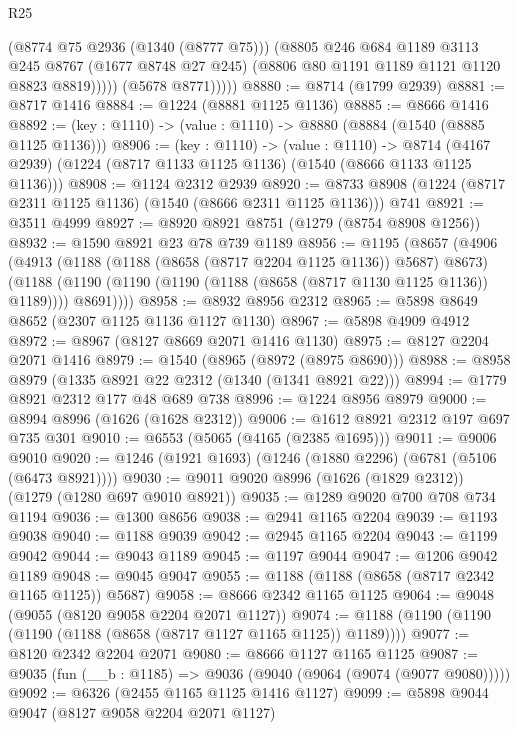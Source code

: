 \begin{lexlean}{R25}
\begin{coremodule}
                  (@8774 @75 @2936 (@1340 (@8777 @75)))
                  (@8805
                    @246
                    @684
                    @1189
                    @3113
                    @245
                    @8767
                    (@1677 @8748 @27 @245)
                    (@8806 @80 @1191 @1189 @1121 @1120 @8823 @8819)))))
            (@5678 @8771)))))
@8880 := @8714 (@1799 @2939)
@8881 := @8717 @1416
@8884 := @1224 (@8881 @1125 @1136)
@8885 := @8666 @1416
@8892 := (key : @1110) -> (value : @1110) -> @8880 (@8884 (@1540 (@8885 @1125 @1136)))
@8906 := (key : @1110) ->
  (value : @1110) ->
  @8714 (@4167 @2939) (@1224 (@8717 @1133 @1125 @1136) (@1540 (@8666 @1133 @1125 @1136)))
@8908 := @1124 @2312 @2939
@8920 := @8733 @8908 (@1224 (@8717 @2311 @1125 @1136) (@1540 (@8666 @2311 @1125 @1136))) @741
@8921 := @3511 @4999
@8927 := @8920 @8921 @8751 (@1279 (@8754 @8908 @1256))
@8932 := @1590 @8921 @23 @78 @739 @1189
@8956 := @1195
    (@8657
      (@4906
        (@4913
          (@1188 (@1188 (@8658 (@8717 @2204 @1125 @1136)) @5687) @8673)
          (@1188 (@1190 (@1190 (@1190 (@1188 (@8658 (@8717 @1130 @1125 @1136)) @1189)))) @8691))))
@8958 := @8932 @8956 @2312
@8965 := @5898 @8649 @8652 (@2307 @1125 @1136 @1127 @1130)
@8967 := @5898 @4909 @4912
@8972 := @8967 (@8127 @8669 @2071 @1416 @1130)
@8975 := @8127 @2204 @2071 @1416
@8979 := @1540 (@8965 (@8972 (@8975 @8690)))
@8988 := @8958 @8979 (@1335 @8921 @22 @2312 (@1340 (@1341 @8921 @22)))
@8994 := @1779 @8921 @2312 @177 @48 @689 @738
@8996 := @1224 @8956 @8979
@9000 := @8994 @8996 (@1626 (@1628 @2312))
@9006 := @1612 @8921 @2312 @197 @697 @735 @301
@9010 := @6553 (@5065 (@4165 (@2385 @1695)))
@9011 := @9006 @9010
@9020 := @1246 (@1921 @1693) (@1246 (@1880 @2296) (@6781 (@5106 (@6473 @8921))))
@9030 := @9011 @9020 @8996 (@1626 (@1829 @2312)) (@1279 (@1280 @697 @9010 @8921))
@9035 := @1289 @9020 @700 @708 @734 @1194
@9036 := @1300 @8656
@9038 := @2941 @1165 @2204
@9039 := @1193 @9038
@9040 := @1188 @9039
@9042 := @2945 @1165 @2204
@9043 := @1199 @9042
@9044 := @9043 @1189
@9045 := @1197 @9044
@9047 := @1206 @9042 @1189
@9048 := @9045 @9047
@9055 := @1188 (@1188 (@8658 (@8717 @2342 @1165 @1125)) @5687)
@9058 := @8666 @2342 @1165 @1125
@9064 := @9048 (@9055 (@8120 @9058 @2204 @2071 @1127))
@9074 := @1188 (@1190 (@1190 (@1190 (@1188 (@8658 (@8717 @1127 @1165 @1125)) @1189))))
@9077 := @8120 @2342 @2204 @2071
@9080 := @8666 @1127 @1165 @1125
@9087 := @9035 (fun (__b : @1185) => @9036 (@9040 (@9064 (@9074 (@9077 @9080)))))
@9092 := @6326 (@2455 @1165 @1125 @1416 @1127)
@9099 := @5898 @9044 @9047 (@8127 @9058 @2204 @2071 @1127)

\end{coremodule}
\end{lexlean}
